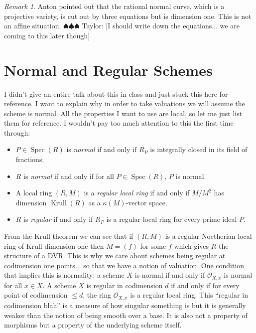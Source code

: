\documentclass[12pt]{article}
\numberwithin{equation}{section}
\theoremstyle{definition}
\theoremstyle{remark}
\newtheorem{remark}[theorem]{Remark}
\newcommand{\Ocal}{\mathcal{O}}
\newcommand{\Spec}{\operatorname{Spec}}
\newcommand{\Krull}{\operatorname{Krull}}
\newcommand{\taylor}[1]{{\color{blue} \sf $\spadesuit\spadesuit\spadesuit$ Taylor: [#1]}}
\begin{document}
\begin{remark}
	Anton pointed out that the rational normal curve, which is a projective variety, is cut out by three equations but is dimension one. 
	This is not an affine situation.
	\taylor{I should write down the equations... we are coming to this later though}
\end{remark}

\section{Normal and Regular Schemes}
I didn't give an entire talk about this in class and just stuck this here for reference.
I want to explain why in order to take valuations we will assume the scheme is normal. 
All the properties I want to use are local, so let me just list them for reference. 
I wouldn't pay too much attention to this the first time through:
\begin{itemize}
	\item $P \in \Spec(R)$ is \emph{normal} if and only if $R_P$ is integrally closed in its field of fractions. 
	\item $R$ is \emph{normal} if and only if for all $P\in \Spec(R)$, $P$ is normal.
	\item A local ring $(R,M)$ is a \emph{regular local ring} if and only if $M/M^2$ has dimension $\Krull(R)$ as a $\kappa(M)$-vector space.
	\item $R$ is \emph{regular} if and only if $R_P$ is a regular local ring for every prime ideal $P$.
\end{itemize}

From the Krull theorem we can see that if $(R,M)$ is a regular Noetherian local ring of Krull dimension one then $M=(f)$ for some $f$ which gives $R$ the structure of a DVR. 
This is why we care about schemes being regular at codimension one points... so that we have a notion of valuation. 
One condition that implies this is normality: a scheme $X$ is normal if and only if $\Ocal_{X,x}$ is normal for all $x\in X$.
A scheme $X$ is regular in codimension $d$ if and only if for every point of codimension $\leq d$, the ring $\Ocal_{X,x}$ is a regular local ring. 
This ``regular in codimension blah'' is a measure of how singular something is but it is generally weaker than the notion of being smooth over a base. 
It is also not a property of morphisms but a property of the underlying scheme itself. 
\end{document}
